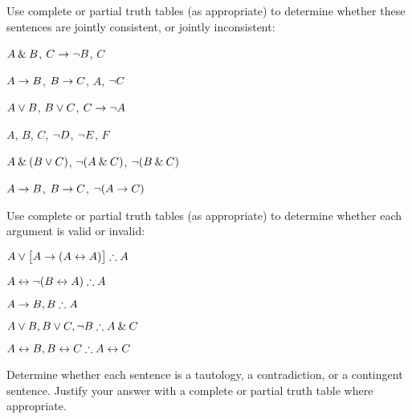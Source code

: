 \solutions
\problempart
\label{pr.TT.consistent4}
Use complete or partial truth tables (as appropriate) to determine whether these sentences are jointly consistent, or jointly inconsistent:
\begin{earg}
\item $A \mathbin{\&} B$, $C\rightarrow \neg B$, $C$ %
\item $A\rightarrow B$, $B\rightarrow C$, $A$, $\neg C$ %
\item $A \vee B$, $B\vee C$, $C\rightarrow \neg A$ %
\item $A$, $B$, $C$, $\neg D$, $\neg E$, $F$ %
\item $A \mathbin{\&} (B \vee C)$, $\neg(A \mathbin{\&} C)$, $\neg(B \mathbin{\&} C)$ %
\item $A \rightarrow B$, $B \rightarrow C$, $\neg(A \rightarrow C)$ %
\end{earg}

\solutions
\problempart
\label{pr.TT.valid4}
Use complete or partial truth tables (as appropriate) to determine whether each argument is valid or invalid:
\begin{earg}
\item $A\eor\bigl[A\eif(A\eiff A)\bigr] \therefore A$ %
\item $A\eiff\enot(B\eiff A) \therefore A$ %
\item $A\eif B, B \therefore A$ %
\item $A\eor B, B\eor C, \enot B \therefore A \eand C$ %
\item $A\eiff B, B\eiff C \therefore A\eiff C$ %
\end{earg}

\problempart
\label{pr.TT.TTorC3}
Determine whether each sentence is a tautology, a contradiction, or a contingent sentence. Justify your answer with a complete or partial truth table where appropriate.


